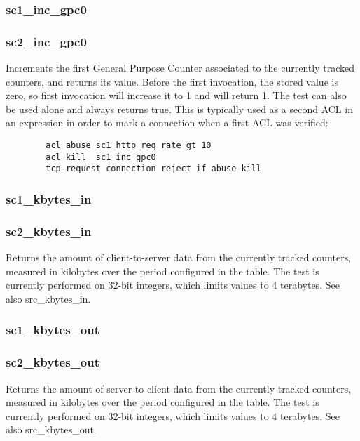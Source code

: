 \subsubsection[sc1\_inc\_gpc0]{sc1\_inc\_gpc0}
\subsubsection[sc2\_inc\_gpc0]{sc2\_inc\_gpc0}
  Increments the first General Purpose Counter associated to the currently
  tracked counters, and returns its value. Before the first invocation, the
  stored value is zero, so first invocation will increase it to 1 and will
  return 1. The test can also be used alone and always returns true. This is
  typically used as a second ACL in an expression in order to mark a connection
  when a first ACL was verified:
  \begin{verbatim}
        acl abuse sc1_http_req_rate gt 10
        acl kill  sc1_inc_gpc0
        tcp-request connection reject if abuse kill
  \end{verbatim}

\subsubsection[sc1\_kbytes\_in]{sc1\_kbytes\_in}
\subsubsection[sc2\_kbytes\_in]{sc2\_kbytes\_in}
  Returns the amount of client-to-server data from the currently tracked
  counters, measured in kilobytes over the period configured in the table. The
  test is currently performed on 32-bit integers, which limits values to 4
  terabytes. See also src\_kbytes\_in.

\subsubsection[sc1\_kbytes\_out]{sc1\_kbytes\_out}
\subsubsection[sc2\_kbytes\_out]{sc2\_kbytes\_out}
  Returns the amount of server-to-client data from the currently tracked
  counters, measured in kilobytes over the period configured in the table. The
  test is currently performed on 32-bit integers, which limits values to 4
  terabytes. See also src\_kbytes\_out.

